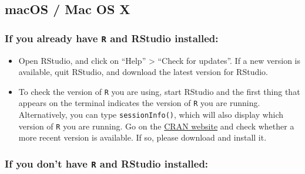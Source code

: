 \documentclass[
  12pt, krantz2,
]{krantz}
\newcommand{\passthrough}[1]{#1}
\providecommand{\tightlist}{%
  \setlength{\itemsep}{0pt}\setlength{\parskip}{0pt}}
\newcommand{\1}{\mathbbm{1}}
\theoremstyle{definition}
\theoremstyle{definition}
\theoremstyle{definition}
\theoremstyle{definition}
\theoremstyle{remark}
\begin{document}
\hypertarget{macos-mac-os-x}{%
\subsection{macOS / Mac OS X}\label{macos-mac-os-x}}

\hypertarget{if-you-already-have-r-and-rstudio-installed-1}{%
\subsubsection*{\texorpdfstring{If you already have \texttt{R} and RStudio installed:}{If you already have R and RStudio installed:}}\label{if-you-already-have-r-and-rstudio-installed-1}}


\begin{itemize}
\tightlist
\item
  Open RStudio, and click on ``Help'' \textgreater{} ``Check for updates''. If a new version is
  available, quit RStudio, and download the latest version for RStudio.
\item
  To check the version of \passthrough{\lstinline!R!} you are using, start RStudio and the first thing
  that appears on the terminal indicates the version of \passthrough{\lstinline!R!} you are running.
  Alternatively, you can type \passthrough{\lstinline!sessionInfo()!}, which will also display which
  version of \passthrough{\lstinline!R!} you are running. Go on the \href{https://cran.r-project.org/bin/macosx/}{CRAN
  website} and check whether a more
  recent version is available. If so, please download and install it.
\end{itemize}

\hypertarget{if-you-dont-have-r-and-rstudio-installed-1}{%
\subsubsection*{\texorpdfstring{If you don't have \texttt{R} and RStudio installed:}{If you don't have R and RStudio installed:}}\label{if-you-dont-have-r-and-rstudio-installed-1}}
\end{document}
